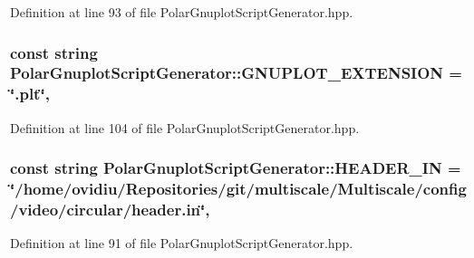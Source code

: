 Definition at line 93 of file Polar\-Gnuplot\-Script\-Generator.\-hpp.

\hypertarget{classmultiscale_1_1video_1_1PolarGnuplotScriptGenerator_ab7c725911d4456addf22db345b622057}{
\subsubsection[{G\-N\-U\-P\-L\-O\-T\-\_\-\-E\-X\-T\-E\-N\-S\-I\-O\-N}]{\setlength{\rightskip}{0pt plus 5cm}const string Polar\-Gnuplot\-Script\-Generator\-::\-G\-N\-U\-P\-L\-O\-T\-\_\-\-E\-X\-T\-E\-N\-S\-I\-O\-N = \char`\"{}.plt\char`\"{}\hspace{0.3cm}{\ttfamily [static]}, {\ttfamily [private]}}}\label{classmultiscale_1_1video_1_1PolarGnuplotScriptGenerator_ab7c725911d4456addf22db345b622057}


Definition at line 104 of file Polar\-Gnuplot\-Script\-Generator.\-hpp.

\hypertarget{classmultiscale_1_1video_1_1PolarGnuplotScriptGenerator_acd5fb0e27c9f7857d68b7ec9cb62fb74}{
\subsubsection[{H\-E\-A\-D\-E\-R\-\_\-\-I\-N}]{\setlength{\rightskip}{0pt plus 5cm}const string Polar\-Gnuplot\-Script\-Generator\-::\-H\-E\-A\-D\-E\-R\-\_\-\-I\-N = \char`\"{}/home/ovidiu/Repositories/git/multiscale/Multiscale/config/video/circular/header.\-in\char`\"{}\hspace{0.3cm}{\ttfamily [static]}, {\ttfamily [private]}}}\label{classmultiscale_1_1video_1_1PolarGnuplotScriptGenerator_acd5fb0e27c9f7857d68b7ec9cb62fb74}


Definition at line 91 of file Polar\-Gnuplot\-Script\-Generator.\-hpp.


